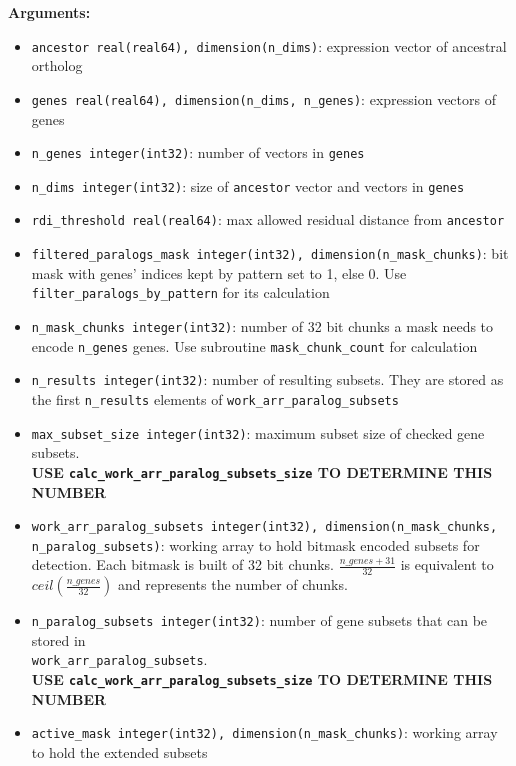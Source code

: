 \begin{enumerate}
        \textbf{Arguments:}
        \begin{itemize}
            \item \lstinline!ancestor real(real64), dimension(n_dims)!: expression vector of ancestral ortholog
            \item \lstinline!genes real(real64), dimension(n_dims, n_genes)!: expression vectors of genes
            \item \lstinline!n_genes integer(int32)!: number of vectors in \lstinline!genes!
            \item \lstinline!n_dims integer(int32)!: size of \lstinline!ancestor! vector and vectors in \lstinline!genes!
            \item \lstinline!rdi_threshold real(real64)!: max allowed residual distance from \lstinline!ancestor!
            \item \lstinline!filtered_paralogs_mask integer(int32), dimension(n_mask_chunks)!: bit mask with genes' indices kept by pattern set to 1, else 0. Use \lstinline!filter_paralogs_by_pattern! for its calculation
            \item \lstinline!n_mask_chunks integer(int32)!: number of 32 bit chunks a mask needs to encode \lstinline!n_genes! genes. Use subroutine \lstinline!mask_chunk_count! for calculation
            \item \lstinline!n_results integer(int32)!: number of resulting subsets. They are stored as the first \lstinline!n_results! elements of \lstinline!work_arr_paralog_subsets!
            \item \lstinline!max_subset_size integer(int32)!: maximum subset size of checked gene subsets. \\ \textbf{USE \lstinline!calc_work_arr_paralog_subsets_size! TO DETERMINE THIS NUMBER}
            \item \lstinline!work_arr_paralog_subsets integer(int32), dimension(n_mask_chunks, n_paralog_subsets)!: working array to hold bitmask encoded subsets for detection. Each bitmask is built of 32 bit chunks. \(\frac{n\_genes + 31}{32}\) is equivalent to \(ceil(\frac{n\_genes}{32})\) and represents the number of chunks.
            \item \lstinline!n_paralog_subsets integer(int32)!: number of gene subsets that can be stored in \\ \lstinline!work_arr_paralog_subsets!. \\ \textbf{USE \lstinline!calc_work_arr_paralog_subsets_size! TO DETERMINE THIS NUMBER}
            \item \lstinline!active_mask integer(int32), dimension(n_mask_chunks)!: working array to hold the extended subsets

\end{itemize}
\end{enumerate}
